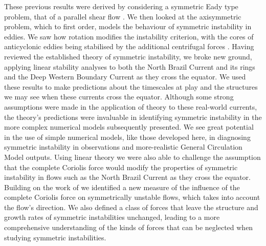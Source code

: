 These previous results were derived by considering a symmetric Eady type problem, that of a parallel shear flow \citep{Eady1949, Ooyama1966, Stone1966, Hoskins1974}. We then looked at the axisymmetric problem, which to first order, models the behaviour of symmetric instability in eddies. We saw how rotation modifies the instability criterion, with the cores of anticyclonic eddies being stabilised by the additional centrifugal forces \citep{Buckingham2021}. Having reviewed the established theory of symmetric instability, we broke new ground, applying linear stability analyses to both the North Brazil Current and its rings and the Deep Western Boundary Current as they cross the equator. We used these results to make predictions about the timescales at play and the structures we may see when these currents cross the equator. Although some strong assumptions were made in the application of theory to these real-world currents, the theory's predictions were invaluable in identifying symmetric instability in the more complex numerical models subsequently presented. We see great potential in the use of simple numerical models, like those developed here, in diagnosing symmetric instability in observations and more-realistic General Circulation Model outputs. Using linear theory we were also able to challenge the assumption that the complete Coriolis force would modify the properties of symmetric instability in flows such as the North Brazil Current as they cross the equator. Building on the work of \citet{Zeitlin2018a} we identified a new measure of the influence of the complete Coriolis force on symmetrically unstable flows, which takes into account the flow's direction. We also defined a class of forces that leave the structure and growth rates of symmetric instabilities unchanged, leading to a more comprehensive understanding of the kinds of forces that can be neglected when studying symmetric instabilities.

